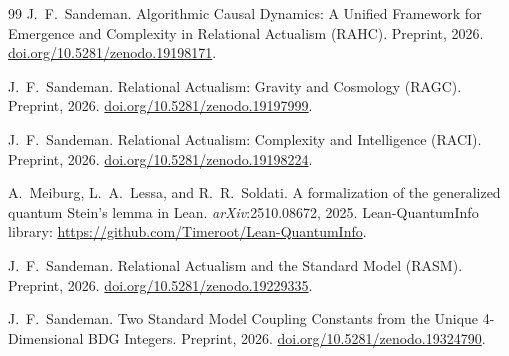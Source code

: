 \documentclass[11pt,a4paper]{article}
\theoremstyle{plain}
\theoremstyle{definition}
\theoremstyle{remark}
\begin{document}
\begin{thebibliography}{99}
J.~F.~Sandeman.
\newblock Algorithmic Causal Dynamics: A Unified Framework for Emergence and
  Complexity in Relational Actualism ({RAHC}).
\newblock Preprint, 2026.
\newblock \href{https://doi.org/10.5281/zenodo.19198171}{doi.org/10.5281/zenodo.19198171}.

J.~F.~Sandeman.
\newblock Relational Actualism: Gravity and Cosmology ({RAGC}).
\newblock Preprint, 2026.
\newblock \href{https://doi.org/10.5281/zenodo.19197999}{doi.org/10.5281/zenodo.19197999}.

J.~F.~Sandeman.
\newblock Relational Actualism: Complexity and Intelligence ({RACI}).
\newblock Preprint, 2026.
\newblock \href{https://doi.org/10.5281/zenodo.19198224}{doi.org/10.5281/zenodo.19198224}.


A.~Meiburg, L.~A.~Lessa, and R.~R.~Soldati.
\newblock A formalization of the generalized quantum {Stein's} lemma in {Lean}.
\newblock \textit{arXiv}:2510.08672, 2025.
\newblock Lean-QuantumInfo library: \url{https://github.com/Timeroot/Lean-QuantumInfo}.

J.~F.~Sandeman.
\newblock Relational Actualism and the Standard Model ({RASM}).
\newblock Preprint, 2026.
\newblock \href{https://doi.org/10.5281/zenodo.19229335}{doi.org/10.5281/zenodo.19229335}.

J.~F.~Sandeman.
\newblock Two Standard Model Coupling Constants from the Unique 4-Dimensional
  BDG Integers.
\newblock Preprint, 2026.
\newblock \href{https://doi.org/10.5281/zenodo.19324790}{doi.org/10.5281/zenodo.19324790}.

\end{thebibliography}
\end{document}
